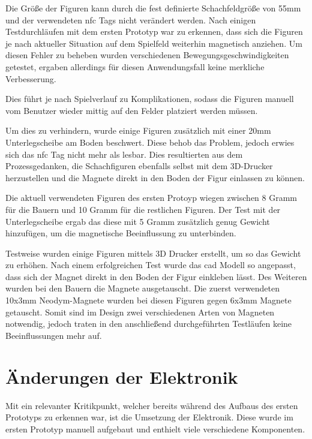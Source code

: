 Die Größe der Figuren kann durch die fest definierte Schachfeldgröße von
55mm und der verwendeten \gls{nfc} Tags nicht verändert werden. Nach
einigen Testdurchläufen mit dem ersten Prototyp war zu erkennen, dass
sich die Figuren je nach aktueller Situation auf dem Spielfeld weiterhin
magnetisch anziehen. Um diesen Fehler zu beheben wurden verschiedenen
Bewegungsgeschwindigkeiten getestet, ergaben allerdings für diesen
Anwendungsfall keine merkliche Verbesserung.

Dies führt je nach Spielverlauf zu Komplikationen, sodass die Figuren
manuell vom Benutzer wieder mittig auf den Felder platziert werden
müssen.

Um dies zu verhindern, wurde einige Figuren zusätzlich mit einer 20mm
Unterlegscheibe am Boden beschwert. Diese behob das Problem, jedoch
erwies sich das \gls{nfc} Tag nicht mehr als lesbar. Dies resultierten
aus dem Prozessgedanken, die Schachfiguren ebenfalls selbst mit dem
3D-Drucker herzustellen und die Magnete direkt in den Boden der Figur
einlassen zu können.

Die aktuell verwendeten Figuren des ersten Protoyp wiegen zwischen 8
Gramm für die Bauern und 10 Gramm für die restlichen Figuren. Der Test
mit der Unterlegscheibe ergab das diese mit 5 Gramm zusätzlich genug
Gewicht hinzufügen, um die magnetische Beeinflussung zu unterbinden.

Testweise wurden einige Figuren mittels 3D Drucker erstellt, um so das
Gewicht zu erhöhen. Nach einem erfolgreichen Test wurde das \gls{cad}
Modell so angepasst, dass sich der Magnet direkt in den Boden der Figur
einkleben lässt. Des Weiteren wurden bei den Bauern die Magnete
ausgetauscht. Die zuerst verwendeten 10x3mm Neodym-Magnete wurden bei
diesen Figuren gegen 6x3mm Magnete getauscht. Somit sind im Design zwei
verschiedenen Arten von Magneten notwendig, jedoch traten in den
anschließend durchgeführten Testläufen keine Beeinflussungen mehr auf.

\hypertarget{uxe4nderungen-der-elektronik}{%
\section{Änderungen der Elektronik}\label{uxe4nderungen-der-elektronik}}

Mit ein relevanter Kritikpunkt, welcher bereits während des Aufbaus des
ersten Prototyps zu erkennen war, ist die Umsetzung der Elektronik.
Diese wurde im ersten Prototyp manuell aufgebaut und enthielt viele
verschiedene Komponenten.

